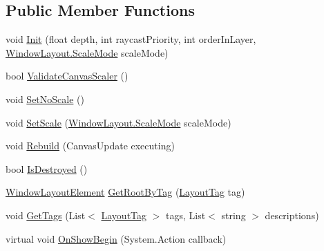 \subsection*{Public Member Functions}
\begin{DoxyCompactItemize}
\item 
void \hyperlink{class_unity_engine_1_1_u_i_1_1_windows_1_1_window_layout_abe5062eeadb36da2816d254048261cd6}{Init} (float depth, int raycast\+Priority, int order\+In\+Layer, \hyperlink{class_unity_engine_1_1_u_i_1_1_windows_1_1_window_layout_ad2ea7c8dd3f2f3c0edc178901af60728}{Window\+Layout.\+Scale\+Mode} scale\+Mode)
\item 
bool \hyperlink{class_unity_engine_1_1_u_i_1_1_windows_1_1_window_layout_a317d630e45729ffaeac7446ef2cb3baf}{Validate\+Canvas\+Scaler} ()
\item 
void \hyperlink{class_unity_engine_1_1_u_i_1_1_windows_1_1_window_layout_a2bd4c9ed000916640d128873e01f4142}{Set\+No\+Scale} ()
\item 
void \hyperlink{class_unity_engine_1_1_u_i_1_1_windows_1_1_window_layout_af42bfabe9e3dc8df91c424dd28ac9a46}{Set\+Scale} (\hyperlink{class_unity_engine_1_1_u_i_1_1_windows_1_1_window_layout_ad2ea7c8dd3f2f3c0edc178901af60728}{Window\+Layout.\+Scale\+Mode} scale\+Mode)
\item 
void \hyperlink{class_unity_engine_1_1_u_i_1_1_windows_1_1_window_layout_ad400aac53f94267136e6492384fcb177}{Rebuild} (Canvas\+Update executing)
\item 
bool \hyperlink{class_unity_engine_1_1_u_i_1_1_windows_1_1_window_layout_ac041d5c449c7b63f40d226e827d0a611}{Is\+Destroyed} ()
\item 
\hyperlink{class_unity_engine_1_1_u_i_1_1_windows_1_1_window_layout_element}{Window\+Layout\+Element} \hyperlink{class_unity_engine_1_1_u_i_1_1_windows_1_1_window_layout_afdb09503b95cc7d4ca60089a4aa687fd}{Get\+Root\+By\+Tag} (\hyperlink{namespace_unity_engine_1_1_u_i_1_1_windows_a954ff5db0de6295464f3b95598158333}{Layout\+Tag} tag)
\item 
void \hyperlink{class_unity_engine_1_1_u_i_1_1_windows_1_1_window_layout_ad27c1c66648a86f9765bc5a6c895f9a9}{Get\+Tags} (List$<$ \hyperlink{namespace_unity_engine_1_1_u_i_1_1_windows_a954ff5db0de6295464f3b95598158333}{Layout\+Tag} $>$ tags, List$<$ string $>$ descriptions)
\item 
virtual void \hyperlink{class_unity_engine_1_1_u_i_1_1_windows_1_1_window_layout_a167bd9b427e24467e339809f01ae0035}{On\+Show\+Begin} (System.\+Action callback)
\item 

\end{DoxyCompactItemize}
